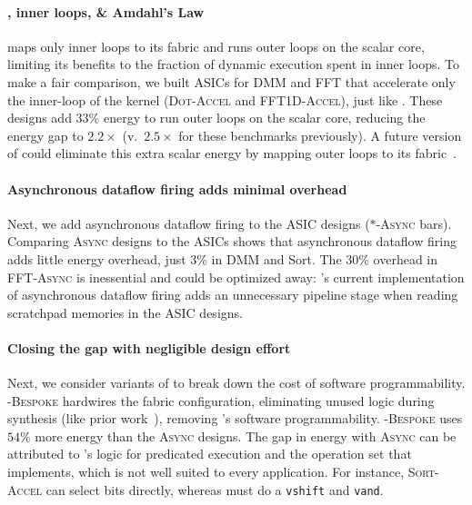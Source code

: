 \paragraph{\snafuarch, inner loops, \& Amdahl's Law}
\snafu maps only inner loops to its fabric and runs outer loops on the
scalar core, limiting its benefits to the fraction of dynamic
execution spent in inner loops.
%
To make a fair comparison, we built ASICs for DMM and FFT that
accelerate only the inner-loop of the kernel ({\scshape Dot-Accel} and
{\scshape FFT1D-Accel}), just like \snafuarch.
% 
These designs add $33\%$ energy to run outer loops on the scalar core,
reducing the energy gap to $2.2\times$ (v.\ $2.5\times$ for these benchmarks previously).
%
A future version of \snafu could eliminate this extra scalar energy by mapping outer loops to its fabric~\cite{weng2020hybrid}.

\paragraph{Asynchronous dataflow firing adds minimal overhead}
Next, we add asynchronous dataflow firing to the ASIC designs
({\scshape $*$-Async} bars).
% 
Comparing {\scshape Async} designs to the ASICs shows that asynchronous dataflow
firing adds little energy overhead, just 3\% in DMM and Sort.
%
The 30\% overhead in {\scshape FFT-Async} is inessential and could be optimized away:
\snafu's current implementation of asynchronous dataflow firing adds an unnecessary pipeline stage when reading scratchpad memories in the ASIC designs.

\paragraph{Closing the gap with negligible design effort}
Next, we consider variants of \snafuarch to break down the cost of
software programmability.
%
{\scshape \snafu-Bespoke} hardwires the fabric configuration, eliminating unused
logic during synthesis (like prior work~\cite{cherupalli:isca17:bespoke}),
removing \snafuarch's software programmability.
%
{\scshape \snafu-Bespoke} uses $54\%$ more energy than the {\scshape Async} designs.
% 
The gap in energy with {\scshape Async} can be attributed to \snafu's logic for
predicated execution and the operation set that \snafu implements, which is not
well suited to every application.  For instance, {\scshape Sort-Accel} can
select bits directly, whereas \snafu must do a {\tt vshift} and {\tt vand}.

